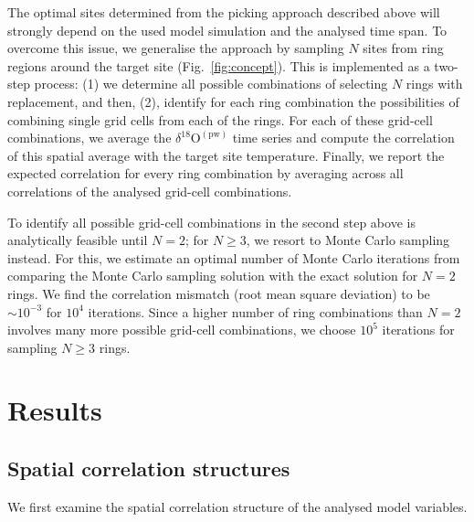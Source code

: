 \documentclass[cp, manuscript]{copernicus}
\begin{document}
The optimal sites determined from the picking approach described above will
strongly depend on the used model simulation and the analysed time span. To
overcome this issue, we generalise the approach by sampling $N$ sites from
ring regions around the target site (Fig.~\ref{fig:concept}).  This is
implemented as a two-step process: (1) we determine all possible combinations of
selecting $N$ rings with replacement, and then, (2), identify for each ring
combination the possibilities of combining single grid cells from each of the
rings. For each of these grid-cell combinations, we average the
$\delta^{18}\mathrm{O}^{\mathrm{(pw)}}$ time series and compute the correlation
of this spatial average with the target site temperature. Finally, we report the
expected correlation for every ring combination by averaging across all
correlations of the analysed grid-cell combinations.

To identify all possible grid-cell combinations in the second step above is
analytically feasible until $N=2$; for $N\geq3$, we resort to Monte Carlo
sampling instead. For this, we estimate an optimal number of Monte Carlo
iterations from comparing the Monte Carlo sampling solution with the exact
solution for $N=2$ rings. We find the correlation mismatch (root mean
square deviation) to be $\sim10^{-3}$ for $10^4$ iterations. Since a higher
number of ring combinations than $N=2$ involves many more possible grid-cell
combinations, we choose $10^5$ iterations for sampling $N\geq3$ rings.

\section{Results}\label{results}

\subsection{Spatial correlation structures}\label{results:cor.struct}

We first examine the spatial correlation structure of the analysed model
variables.
\end{document}
